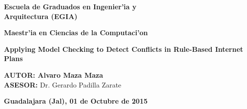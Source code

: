 \begin{center}
\Large
\textbf{Escuela de Graduados en Ingenier'ia y\\ Arquitectura (EGIA)}\\
\vspace{20 pt}

\textbf{Maestr'ia en Ciencias de la Computaci'on}\\
\vspace{35 pt}

\Huge
\textbf{Applying Model Checking to Detect Conflicts in Rule-Based Internet Plans}\\
\vspace{50 pt}

\Large
\begin{flushleft}
\hspace{5pt}\textbf{AUTOR: \hspace{4pt}Alvaro Maza Maza}\\
\vspace{5pt}
\hspace{5pt}\textbf{ASESOR:} Dr. Gerardo Padilla Zarate \\
\end{flushleft}

\large
\vspace{15pt}
\textbf{Guadalajara (Jal), 01 de Octubre de 2015}
\end{center}
\clearpage

\renewcommand{\baselinestretch}{1.5}